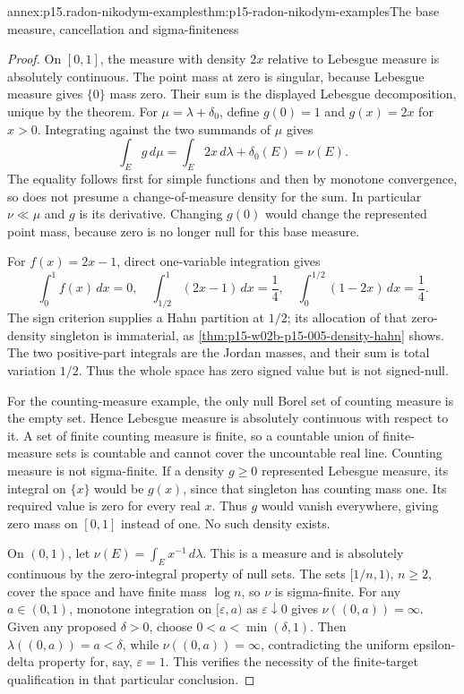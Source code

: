 \begin{annexitem}{annex:p15.radon-nikodym-examples}{thm:p15-radon-nikodym-examples}{The base measure, cancellation and sigma-finiteness}
\begin{proof}
On \([0,1]\), the measure with density \(2x\) relative to Lebesgue
measure is absolutely continuous. The point mass at zero is singular,
because Lebesgue measure gives \(\{0\}\) mass zero.
Their sum is the displayed Lebesgue decomposition, unique by the theorem.
For \(\mu=\lambda+\delta_0\), define \(g(0)=1\) and \(g(x)=2x\)
for \(x>0\). Integrating against the two summands of \(\mu\) gives
\[
                     \int_Eg\,d\mu=\int_E2x\,d\lambda+\delta_0(E)
                                      =\nu(E).
\]
The equality follows first for simple functions and then by monotone
convergence, so does not presume a change-of-measure density for the sum.
In particular \(\nu\ll\mu\) and \(g\) is its derivative.
Changing \(g(0)\) would change the represented point mass, because
zero is no longer null for this base measure.

For \(f(x)=2x-1\), direct one-variable integration gives
\[
 \int_0^1f(x)\,dx=0,\quad
 \int_{1/2}^1(2x-1)\,dx=\frac14,\quad
 \int_0^{1/2}(1-2x)\,dx=\frac14 .
\]
The sign criterion supplies a Hahn partition at \(1/2\);
its allocation of that zero-density singleton is immaterial, as
\cref{thm:p15-w02b-p15-005-density-hahn} shows.
The two positive-part integrals are the Jordan masses, and their sum
is total variation \(1/2\). Thus the whole space has zero signed value
but is not signed-null.

For the counting-measure example, the only null Borel set of counting
measure is the empty set. Hence Lebesgue measure is absolutely
continuous with respect to it.
A set of finite counting measure is finite, so a countable union
of finite-measure sets is countable and cannot cover the uncountable
real line. Counting measure is not sigma-finite.
If a density \(g\geq0\) represented Lebesgue measure, its integral
on \(\{x\}\) would be \(g(x)\), since that singleton has counting
mass one. Its required value is zero for every real \(x\).
Thus \(g\) would vanish everywhere, giving zero mass on \([0,1]\)
instead of one. No such density exists.

On \((0,1)\), let \(\nu(E)=\int_E x^{-1}\,d\lambda\).
This is a measure and is absolutely continuous by the zero-integral
property of null sets. The sets \([1/n,1)\), \(n\geq2\), cover the
space and have finite mass \(\log n\), so \(\nu\) is sigma-finite.
For any \(a\in(0,1)\), monotone integration on \([\varepsilon,a)\)
as \(\varepsilon\downarrow0\) gives
\(\nu((0,a))=\infty\).
Given any proposed \(\delta>0\), choose \(0<a<\min(\delta,1)\).
Then \(\lambda((0,a))=a<\delta\), while \(\nu((0,a))=\infty\),
contradicting the uniform epsilon-delta property for, say,
\(\varepsilon=1\). This verifies the necessity of the finite-target
qualification in that particular conclusion.
\end{proof}
\end{annexitem}
